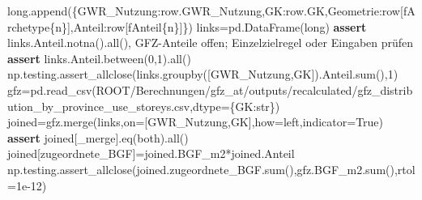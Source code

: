 \documentclass[
  ngerman,
  a4paper,
  DIV=11]{scrreprt}
\newenvironment{Shaded}{\begin{snugshade}}{\end{snugshade}}
\newcommand{\BuiltInTok}[1]{\textcolor[rgb]{0.00,0.23,0.31}{#1}}
\newcommand{\ControlFlowTok}[1]{\textcolor[rgb]{0.00,0.23,0.31}{\textbf{#1}}}
\newcommand{\DecValTok}[1]{\textcolor[rgb]{0.68,0.00,0.00}{#1}}
\newcommand{\FloatTok}[1]{\textcolor[rgb]{0.68,0.00,0.00}{#1}}
\newcommand{\NormalTok}[1]{\textcolor[rgb]{0.00,0.23,0.31}{#1}}
\newcommand{\OperatorTok}[1]{\textcolor[rgb]{0.37,0.37,0.37}{#1}}
\newcommand{\SpecialCharTok}[1]{\textcolor[rgb]{0.37,0.37,0.37}{#1}}
\newcommand{\SpecialStringTok}[1]{\textcolor[rgb]{0.13,0.47,0.30}{#1}}
\newcommand{\StringTok}[1]{\textcolor[rgb]{0.13,0.47,0.30}{#1}}
\newcommand{\VariableTok}[1]{\textcolor[rgb]{0.07,0.07,0.07}{#1}}
\begin{document}
\begin{Shaded}
\begin{Highlighting}[]
            \BuiltInTok{long}\NormalTok{.append(\{}\StringTok{\textquotesingle{}GWR\_Nutzung\textquotesingle{}}\NormalTok{:row.GWR\_Nutzung,}\StringTok{\textquotesingle{}GK\textquotesingle{}}\NormalTok{:row.GK,}\StringTok{\textquotesingle{}Geometrie\textquotesingle{}}\NormalTok{:row[}\SpecialStringTok{f\textquotesingle{}Archetype}\SpecialCharTok{\{}\NormalTok{n}\SpecialCharTok{\}}\SpecialStringTok{\textquotesingle{}}\NormalTok{],}\StringTok{\textquotesingle{}Anteil\textquotesingle{}}\NormalTok{:row[}\SpecialStringTok{f\textquotesingle{}Anteil}\SpecialCharTok{\{}\NormalTok{n}\SpecialCharTok{\}}\SpecialStringTok{\textquotesingle{}}\NormalTok{]\})}
\NormalTok{links}\OperatorTok{=}\NormalTok{pd.DataFrame(}\BuiltInTok{long}\NormalTok{)}
\ControlFlowTok{assert}\NormalTok{ links.Anteil.notna().}\BuiltInTok{all}\NormalTok{(), }\StringTok{\textquotesingle{}GFZ{-}Anteile offen; Einzelzielregel oder Eingaben prüfen\textquotesingle{}}
\ControlFlowTok{assert}\NormalTok{ links.Anteil.between(}\DecValTok{0}\NormalTok{,}\DecValTok{1}\NormalTok{).}\BuiltInTok{all}\NormalTok{()}
\NormalTok{np.testing.assert\_allclose(links.groupby([}\StringTok{\textquotesingle{}GWR\_Nutzung\textquotesingle{}}\NormalTok{,}\StringTok{\textquotesingle{}GK\textquotesingle{}}\NormalTok{]).Anteil.}\BuiltInTok{sum}\NormalTok{(),}\DecValTok{1}\NormalTok{)}
\NormalTok{gfz}\OperatorTok{=}\NormalTok{pd.read\_csv(ROOT}\OperatorTok{/}\StringTok{\textquotesingle{}Berechnungen/gfz\_at/outputs/recalculated/gfz\_distribution\_by\_province\_use\_storeys.csv\textquotesingle{}}\NormalTok{,dtype}\OperatorTok{=}\NormalTok{\{}\StringTok{\textquotesingle{}GK\textquotesingle{}}\NormalTok{:}\BuiltInTok{str}\NormalTok{\})}
\NormalTok{joined}\OperatorTok{=}\NormalTok{gfz.merge(links,on}\OperatorTok{=}\NormalTok{[}\StringTok{\textquotesingle{}GWR\_Nutzung\textquotesingle{}}\NormalTok{,}\StringTok{\textquotesingle{}GK\textquotesingle{}}\NormalTok{],how}\OperatorTok{=}\StringTok{\textquotesingle{}left\textquotesingle{}}\NormalTok{,indicator}\OperatorTok{=}\VariableTok{True}\NormalTok{)}
\ControlFlowTok{assert}\NormalTok{ joined[}\StringTok{\textquotesingle{}\_merge\textquotesingle{}}\NormalTok{].eq(}\StringTok{\textquotesingle{}both\textquotesingle{}}\NormalTok{).}\BuiltInTok{all}\NormalTok{()}
\NormalTok{joined[}\StringTok{\textquotesingle{}zugeordnete\_BGF\textquotesingle{}}\NormalTok{]}\OperatorTok{=}\NormalTok{joined.BGF\_m2}\OperatorTok{*}\NormalTok{joined.Anteil}
\NormalTok{np.testing.assert\_allclose(joined.zugeordnete\_BGF.}\BuiltInTok{sum}\NormalTok{(),gfz.BGF\_m2.}\BuiltInTok{sum}\NormalTok{(),rtol}\OperatorTok{=}\FloatTok{1e{-}12}\NormalTok{)}

\end{Highlighting}
\end{Shaded}
\end{document}
